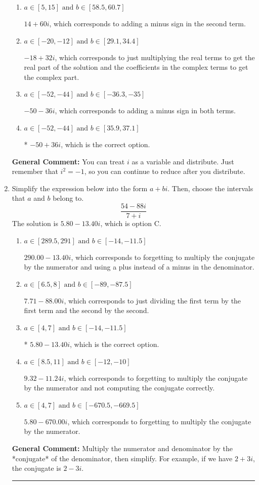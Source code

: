 \documentclass{extbook}[14pt]
\newcommand{\litem}[1]{\item #1

\rule{\textwidth}{0.4pt}}
\begin{document}
\begin{enumerate}
{\begin{enumerate}[label=\Alph*.]
 $14 - 60 i$, which corresponds to adding a minus sign in the first term.
\item \( a \in [5, 15] \text{ and } b \in [58.5, 60.7] \)

 $14 + 60 i$, which corresponds to adding a minus sign in the second term.
\item \( a \in [-20, -12] \text{ and } b \in [29.1, 34.4] \)

 $-18 + 32 i$, which corresponds to just multiplying the real terms to get the real part of the solution and the coefficients in the complex terms to get the complex part.
\item \( a \in [-52, -44] \text{ and } b \in [-36.3, -35] \)

 $-50 - 36 i$, which corresponds to adding a minus sign in both terms.
\item \( a \in [-52, -44] \text{ and } b \in [35.9, 37.1] \)

* $-50 + 36 i$, which is the correct option.
\end{enumerate}

\textbf{General Comment:} You can treat $i$ as a variable and distribute. Just remember that $i^2=-1$, so you can continue to reduce after you distribute.
}
\litem{
Simplify the expression below into the form $a+bi$. Then, choose the intervals that $a$ and $b$ belong to.
\[ \frac{54 - 88 i}{7 + i} \]The solution is \( 5.80  - 13.40 i \), which is option C.\begin{enumerate}[label=\Alph*.]
\item \( a \in [289.5, 291] \text{ and } b \in [-14, -11.5] \)

 $290.00  - 13.40 i$, which corresponds to forgetting to multiply the conjugate by the numerator and using a plus instead of a minus in the denominator.
\item \( a \in [6.5, 8] \text{ and } b \in [-89, -87.5] \)

 $7.71  - 88.00 i$, which corresponds to just dividing the first term by the first term and the second by the second.
\item \( a \in [4, 7] \text{ and } b \in [-14, -11.5] \)

* $5.80  - 13.40 i$, which is the correct option.
\item \( a \in [8.5, 11] \text{ and } b \in [-12, -10] \)

 $9.32  - 11.24 i$, which corresponds to forgetting to multiply the conjugate by the numerator and not computing the conjugate correctly.
\item \( a \in [4, 7] \text{ and } b \in [-670.5, -669.5] \)

 $5.80  - 670.00 i$, which corresponds to forgetting to multiply the conjugate by the numerator.
\end{enumerate}

\textbf{General Comment:} Multiply the numerator and denominator by the *conjugate* of the denominator, then simplify. For example, if we have $2+3i$, the conjugate is $2-3i$.
}
\end{enumerate}
\end{document}

